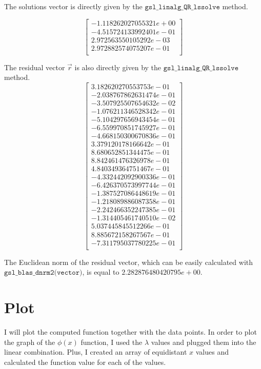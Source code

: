\documentclass{article}
\newcommand{\code}{\texttt}
\begin{document}
The solutions vector is directly given by the $\code{gsl\_linalg\_QR\_lssolve}$ method.

$$
\begin{bmatrix}
-1.118262027055321e+00\\
-4.515724133992401e-01\\
2.972563550105292e-03\\
2.972882574075207e-01\\
\end{bmatrix}
$$

The residual vector $\vec{r}$ is also directly given by the $\code{gsl\_linalg\_QR\_lssolve}$ method.
$$
\begin{bmatrix}
3.182620270553753e-01\\
-2.038767862631474e-01\\
-3.507925507654632e-02\\
-1.076211346528342e-01\\
-5.104297656943454e-01\\
-6.559970851745927e-01\\
-4.668150300670836e-01\\
3.379120178166642e-01\\
8.680652851344475e-01\\
8.842461476326978e-01\\
4.840349364751467e-01\\
-4.332442092900336e-01\\
-6.426370573997744e-01\\
-1.387527086448619e-01\\
-1.218089886087358e-01\\
-2.242466352247385e-01\\
-1.314405461740510e-02\\
5.037445845512266e-01\\
8.885672158267567e-01\\
-7.311795037780225e-01\\
\end{bmatrix} 
$$

The Euclidean norm of the residual vector, which can be easily calculated with $\code{gsl\_blas\_dnrm2(vector)}$, is equal to $2.282876480420795e+00$.
\section{Plot}
I will plot the computed function together with the data points. In order to plot the graph of the $\phi(x)$ function, I used the $\lambda$ values and plugged them into the linear combination. Plus, I created an array of equidistant $x$ values and calculated the function value for each of the values.
\end{document}
